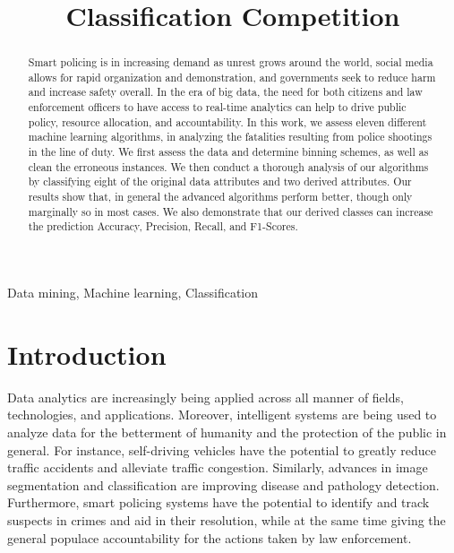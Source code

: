 \documentclass[10pt, conference, compsocconf]{IEEEtran}
\begin{document}
\title{Classification Competition}

\newcommand{\superast}{\raisebox{9pt}{$\ast$}}
\newcommand{\superdagger}{\raisebox{9pt}{$\dagger$}}
\newcommand{\superddagger}{\raisebox{9pt}{$\ddagger$}}
\newcommand{\superS}{\raisebox{9pt}{$\S$}}
\newcommand{\superP}{\raisebox{9pt}{$\P$}}

\author{
}

\maketitle

\begin{abstract}
Smart policing is in increasing demand as unrest grows around the world, social media allows for rapid organization and demonstration, and governments seek to reduce harm and increase safety overall. In the era of big data, the need for both citizens and law enforcement officers to have access to real-time analytics can help to drive public policy, resource allocation, and accountability. In this work, we assess eleven different machine learning algorithms, in analyzing the fatalities resulting from police shootings in the line of duty. We first assess the data and determine binning schemes, as well as clean the erroneous instances. We then conduct a thorough analysis of our algorithms by classifying eight of the original data attributes and two derived attributes. Our results show that, in general the advanced algorithms perform better, though only marginally so in most cases. We also demonstrate that our derived classes can increase the prediction Accuracy, Precision, Recall, and F1-Scores. 
\end{abstract}

\begin{IEEEkeywords}
Data mining, Machine learning, Classification
\end{IEEEkeywords}

\section{Introduction}\label{intro}

Data analytics are increasingly being applied across all manner of fields, technologies, and applications. Moreover, intelligent systems are being used to analyze data for the betterment of humanity and the protection of the public in general. For instance, self-driving vehicles have the potential to greatly reduce traffic accidents and alleviate traffic congestion. Similarly, advances in image segmentation and classification are improving disease and pathology detection. Furthermore, smart policing systems have the potential to identify and track suspects in crimes and aid in their resolution, while at the same time giving the general populace accountability for the actions taken by law enforcement. 
\end{document}
